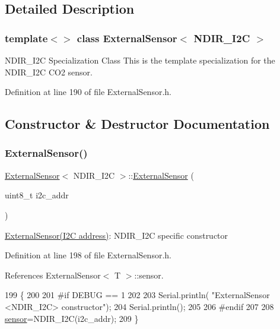 \subsection{Detailed Description}
\subsubsection*{template$<$$>$\newline
class External\+Sensor$<$ N\+D\+I\+R\+\_\+\+I2\+C $>$}

N\+D\+I\+R\+\_\+\+I2C Specialization Class This is the template specialization for the N\+D\+I\+R\+\_\+\+I2C C\+O2 sensor. 

Definition at line 190 of file External\+Sensor.\+h.



\subsection{Constructor \& Destructor Documentation}
\mbox{\label{classExternalSensor_3_01NDIR__I2C_01_4_aa06970ea689679c0e1deb5360e05a0a4}} 
\subsubsection{\texorpdfstring{External\+Sensor()}{ExternalSensor()}}
{\footnotesize\ttfamily \hyperlink{classExternalSensor}{External\+Sensor}$<$ N\+D\+I\+R\+\_\+\+I2C $>$\+::\hyperlink{classExternalSensor}{External\+Sensor} (\begin{DoxyParamCaption}\item[{uint8\+\_\+t}]{i2c\+\_\+addr }\end{DoxyParamCaption})\hspace{0.3cm}{\ttfamily [inline]}}

\hyperlink{classExternalSensor}{External\+Sensor(\+I2\+C address)}\+: N\+D\+I\+R\+\_\+\+I2C specific constructor 

Definition at line 198 of file External\+Sensor.\+h.



References External\+Sensor$<$ T $>$\+::sensor.


\begin{DoxyCode}
199     \{
200     
201 \textcolor{preprocessor}{    #if DEBUG == 1 }
202 
203         Serial.println( \textcolor{stringliteral}{"ExternalSensor <NDIR\_I2C> constructor"});
204         Serial.println();
205     
206 \textcolor{preprocessor}{    #endif}
207 
208         \hyperlink{classExternalSensor_3_01NDIR__I2C_01_4_ae541c9cece7c38674b70114cdb74a7dc}{sensor}=NDIR\_I2C(i2c\_addr);
209     \}
\end{DoxyCode}


